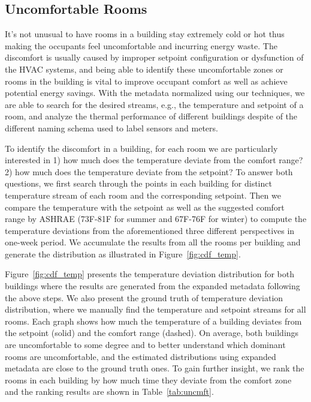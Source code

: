 \subsection{Uncomfortable Rooms}
It's not unusual to have rooms in a building stay extremely cold or hot thus making the occupants feel uncomfortable and incurring energy waste. The discomfort is usually caused by improper setpoint configuration or dysfunction of the HVAC systems, and being able to identify these uncomfortable zones or rooms in the building is vital to improve occupant comfort as well as achieve potential energy savings. With the metadata normalized using our techniques, we are able to search for the desired streams, e.g., the temperature and setpoint of a room, and analyze the thermal performance of different buildings despite of the different naming schema used to label sensors and meters.

To identify the discomfort in a building, for each room we are particularly interested in 1) how much does the temperature deviate from the comfort range? 2) how much does the temperature deviate from the setpoint? To answer both questions, we first search through the points in each building for distinct temperature stream of each room and the corresponding setpoint. Then we compare the temperature with the setpoint as well as the suggested comfort range by ASHRAE (73F-81F for summer and 67F-76F for winter) to compute the temperature deviations from the aforementioned three different perspectives in one-week period. We accumulate the results from all the rooms per building and generate the distribution as illustrated in Figure~\ref{fig:cdf_temp}.

Figure~\ref{fig:cdf_temp} presents the temperature deviation distribution for both buildings where the results are generated from the expanded metadata following the above steps. We also present the ground truth of temperature deviation distribution, where we manually find the temperature and setpoint streams for all rooms. Each graph shows how much the temperature of a building deviates from the setpoint (solid) and the comfort range (dashed). On average, both buildings are uncomfortable to some degree and to better understand which dominant rooms are uncomfortable, and the estimated distributions using expanded metadata are close to the ground truth ones. To gain further insight, we rank the rooms in each building by how much time they deviate from the comfort zone and the ranking results are shown in Table~\ref{tab:uncmft}.

